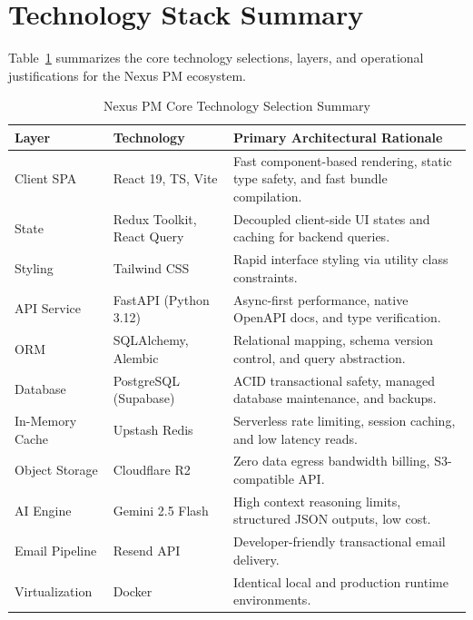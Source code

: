 \section{Technology Stack Summary}
Table~\ref{tab:at_a_glance_tech_stack} summarizes the core technology selections, layers, and operational justifications for the Nexus PM ecosystem.

\begin{table}[h!]
\centering
\small
\renewcommand{\arraystretch}{1.4}
\begin{tabularx}{\textwidth}{l l X}
    \toprule[1.5pt]
    \rowcolor{primary!5}
    \textbf{\color{primary}Layer} & \textbf{\color{primary}Technology} & \textbf{\color{primary}Primary Architectural Rationale} \\
    \midrule
    Client SPA & React 19, TS, Vite & Fast component-based rendering, static type safety, and fast bundle compilation. \\
    State & Redux Toolkit, React Query & Decoupled client-side UI states and caching for backend queries. \\
    Styling & Tailwind CSS & Rapid interface styling via utility class constraints. \\
    API Service & FastAPI (Python 3.12) & Async-first performance, native OpenAPI docs, and type verification. \\
    ORM & SQLAlchemy, Alembic & Relational mapping, schema version control, and query abstraction. \\
    Database & PostgreSQL (Supabase) & ACID transactional safety, managed database maintenance, and backups. \\
    In-Memory Cache & Upstash Redis & Serverless rate limiting, session caching, and low latency reads. \\
    Object Storage & Cloudflare R2 & Zero data egress bandwidth billing, S3-compatible API. \\
    AI Engine & Gemini 2.5 Flash & High context reasoning limits, structured JSON outputs, low cost. \\
    Email Pipeline & Resend API & Developer-friendly transactional email delivery. \\
    Virtualization & Docker & Identical local and production runtime environments. \\
    \bottomrule[1.5pt]
\end{tabularx}
\caption{Nexus PM Core Technology Selection Summary}
\label{tab:at_a_glance_tech_stack}
\end{table}

